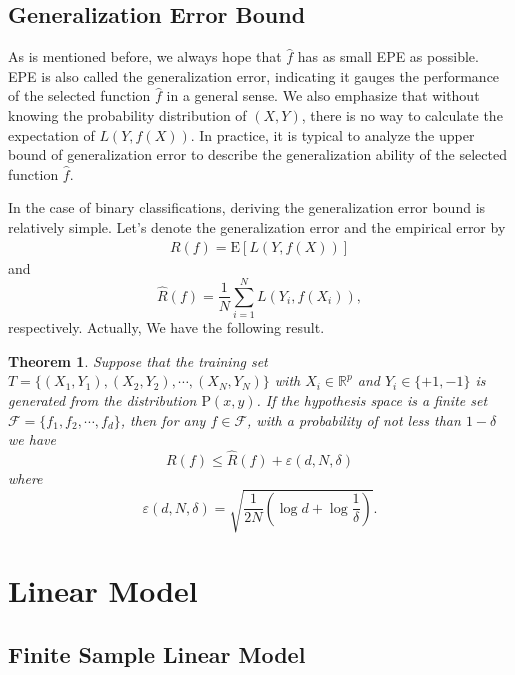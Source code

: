 \documentclass{report}
\newtheorem{theorem}{Theorem}[section]
\theoremstyle{nonumberplain}
\newcommand{\0}{\mathbf{0}}
\begin{document}
\section{Generalization Error Bound}

As is mentioned before, we always hope that $\hat{f}$ has as small EPE as possible. EPE is also called the generalization error, indicating it gauges the performance of the selected function $\hat{f}$ in a general sense. We also emphasize that without knowing the probability distribution of $(X,Y)$, there is no way to calculate the expectation of $L(Y,f(X))$. In practice, it is typical to analyze the upper bound of generalization error to describe the generalization ability of the selected function $\hat{f}$. 

In the case of binary classifications, deriving the generalization error bound is relatively simple. Let's denote the generalization error and the empirical error by
\begin{align*}
	R(f)=\mathrm{E}[L(Y,f(X))]
\end{align*}
and
\[
\hat{R}(f)=\frac{1}{N} \sum_{i=1}^{N} L\left(Y_{i}, f\left(X_{i}\right)\right),
\]
respectively. Actually, We have the following result.

\begin{theorem}
	Suppose that the training set $T=\{(X_1,Y_1),(X_2,Y_2),\cdots,(X_{N},Y_{N})\}$ with $X_i\in\mathbb{R}^p$ and $Y_i\in\{+1,-1\}$ is generated from the distribution $\mathrm{P}(x,y)$. If the hypothesis space is a finite set $\mathcal{F}=\{f_1,f_2,\cdots,f_d\}$, then for any $f\in \mathcal{F}$, with a probability of not less than $1-\delta$ we have
	\[
	R(f) \le \hat{R}(f)+\varepsilon(d, N, \delta)
	\]
	where 
	\[
	\varepsilon(d, N, \delta)=\sqrt{\frac{1}{2 N}\left(\log d+\log \frac{1}{\delta}\right)}.
	\]
\end{theorem}









\chapter{Linear Model}
\section{Finite Sample Linear Model}
\end{document}
